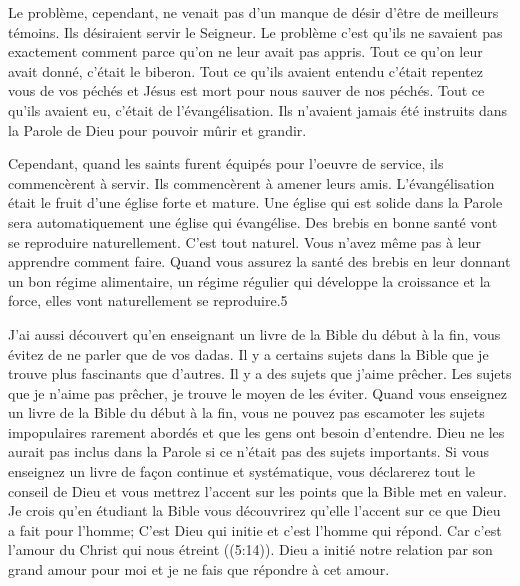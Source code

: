 Le problème, cependant, ne venait pas d’un manque de désir d’être de meilleurs témoins. Ils désiraient servir le
Seigneur. Le problème c’est qu’ils ne savaient pas exactement comment parce qu’on ne leur avait pas appris. Tout ce
qu’on leur avait donné, c’était le biberon. Tout ce qu’ils avaient entendu c’était \og repentez vous de vos péchés \fg{} et
\og Jésus est mort pour nous sauver de nos péchés. \fg{} Tout ce qu’ils avaient eu, c’était de l’évangélisation. Ils n’avaient
jamais été instruits dans la Parole de Dieu pour pouvoir mûrir et grandir.

Cependant, quand les saints furent équipés pour l’oeuvre de service, ils commencèrent à servir. Ils commencèrent à
amener leurs amis. L’évangélisation était le fruit d’une église forte et mature. Une église qui est solide dans la Parole
sera automatiquement une église qui évangélise. Des brebis en bonne santé vont se reproduire naturellement. C’est
tout naturel. Vous n’avez même pas à leur apprendre comment faire. Quand vous assurez la santé des brebis en leur
donnant un bon régime alimentaire, un régime régulier qui développe la croissance et la force, elles vont
naturellement se reproduire.5

J’ai aussi découvert qu’en enseignant un livre de la Bible du début à la fin, vous évitez de ne parler que de vos
dadas. Il y a certains sujets dans la Bible que je trouve plus fascinants que d’autres. Il y a des sujets que j’aime
prêcher. Les sujets que je n’aime pas prêcher, je trouve le moyen de les éviter. Quand vous enseignez un livre de la
Bible du début à la fin, vous ne pouvez pas escamoter les sujets impopulaires rarement abordés et que les gens ont
besoin d’entendre. Dieu ne les aurait pas inclus dans la Parole si ce n’était pas des sujets importants. Si vous
enseignez un livre de façon continue et systématique, vous déclarerez tout le conseil de Dieu et vous mettrez l’accent
sur les points que la Bible met en valeur. Je crois qu’en étudiant la Bible vous découvrirez qu'elle l'accent sur ce que
Dieu a fait pour l’homme; C'est Dieu qui initie et c'est l'homme qui répond. Car c’est l’amour du Christ qui nous étreint
((5:14)). Dieu a initié notre relation par son grand amour pour moi et je ne fais que répondre à cet
amour.

